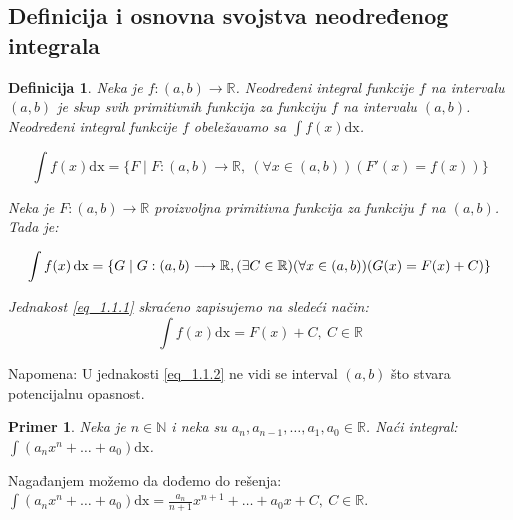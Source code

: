 \documentclass{article}
\newtheorem{definicija}{Definicija}[section]
\newtheorem{prim}{Primer}[section]
\begin{document}
\subsection{Definicija i osnovna svojstva neodređenog integrala}
\begin{defbox}
    \begin{definicija}
        Neka je $f: (a, b) \longrightarrow \mathbb{R}$.
        Neodređeni integral funkcije $f$ na intervalu $(a, b)$ je
        skup svih primitivnih funkcija za funkciju $f$ na intervalu
        $(a, b)$. Neodređeni integral funkcije $f$ obeležavamo sa
        $\int f(x)\text{dx}$.\par
        $$\int f(x) \text{dx} = \{F \mid F: (a, b) \longrightarrow \mathbb{R},\
            (\forall x\in(a,b))(F'(x) = f(x))\}$$\par
        Neka je $F: (a,b) \longrightarrow \mathbb{R}$ proizvoljna
        primitivna funkcija za funkciju $f$ na $(a,b)$. Tada je: \par

        \setcounter{equation}{0}

        \begin{equation} \label{eq_1.1.1}
            \int f(x) \, \text{dx} =\{G \mid G: (a, b)
            \longrightarrow \mathbb{R}, \\
            (\exists C \in \mathbb{R}) (\forall x \in (a, b))
            (G(x) = F(x) + C)\}
        \end{equation}

        Jednakost \eqref{eq_1.1.1} skraćeno zapisujemo na sledeći način:
        \begin{equation}\label{eq_1.1.2}
            \int f(x)\text{dx} = F(x) + C,\ C\in\mathbb{R}
        \end{equation}
    \end{definicija}
    Napomena: U jednakosti \eqref{eq_1.1.2} ne vidi se interval $(a, b)$ što
    stvara potencijalnu opasnost.
\end{defbox}

\begin{primbox}
    \begin{prim}
        Neka je $n \in \mathbb{N}$ i neka su $a_n, a_{n-1},
            \dotsc, a_1, a_0 \in \mathbb{R}$. Naći integral:
        $\int (a_n  x^n + \dotsc + a_0)\text{dx}$.
    \end{prim}
    Nagađanjem možemo da dođemo do rešenja:
    $\int (a_n  x^n + \dotsc + a_0)\text{dx}=\frac{a_n}{n+1}x^{n+1} + \dotsc +
        a_0x + C,\ C\in\mathbb{R}$.
\end{primbox}
\end{document}
